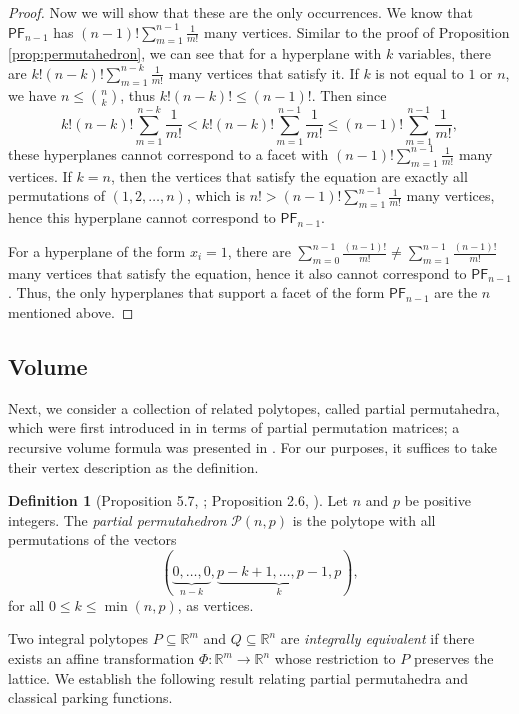 \documentclass[11pt]{amsart}
\theoremstyle{definition}
\newtheorem{definition}[theorem]{Definition}
\newcommand{\0}{\emptyset}
\newcommand{\R}{\mathbb{R}}
\newcommand{\PF}{\mathsf{PF}}
\begin{document}
\begin{proof}
Now we will show that these are the only occurrences. 
We know that $\PF_{n-1}$ has $(n-1)!\sum\limits_{m=1}^{n-1} \frac{1}{m!}$ many  vertices.
Similar to the proof of Proposition \ref{prop:permutahedron}, we can see that for a hyperplane with $k$ variables, there are $k!(n-k)!\sum\limits_{m=1}^{n-k} \frac{1}{m!}$ many vertices that satisfy it. 
If $k$ is not equal to $1$ or $n$, we have $n\leq \binom{n}{k}$, thus $k!(n-k)!\leq (n-1)!$.
Then since $$k!(n-k)!\sum\limits_{m=1}^{n-k} \frac{1}{m!} < k!(n-k)!\sum\limits_{m=1}^{n-1} \frac{1}{m!} \leq (n-1)! \sum\limits_{m=1}^{n-1} \frac{1}{m!},$$  these hyperplanes cannot correspond to a facet with $(n-1)!\sum\limits_{m=1}^{n-1} \frac{1}{m!}$ many vertices.
If $k =n$, then the vertices that satisfy the equation are exactly all permutations of $(1,2,\dots, n)$, which is $n! > (n-1)! \sum\limits_{m=1}^{n-1} \frac{1}{m!}$ many vertices, hence this hyperplane cannot correspond to $\PF_{n-1}$. 

For a hyperplane of the form $x_i = 1$, there are $\sum_{m=0}^{n-1}\frac{(n-1)!}{m!} \neq \sum_{m=1}^{n-1} \frac{(n-1)!}{m!}$ many vertices that satisfy the equation, hence it also cannot correspond to $\PF_{n-1}$. 
Thus, the only hyperplanes that support a facet of the form $\PF_{n-1}$ are the $n$ mentioned above.
\end{proof}


\subsection{Volume}
Next, we consider a collection of related polytopes, called partial permutahedra, which were first introduced in \cite{HS} in terms of partial permutation matrices; a recursive volume formula was presented in \cite{BCC}.
For our purposes, it suffices to take their vertex description as the definition.

\begin{definition}[Proposition 5.7, \cite{HS}; Proposition 2.6, \cite{BCC}]\label{def:pp-vertices} Let $n$ and $p$ be positive integers. 
The \emph{partial permutahedron} $\mathcal{P}(n,p)$ is the polytope with all permutations of the vectors 
\[(\underbrace{0, \ldots, 0}_{n-k}, \underbrace{p-k+1, \ldots, p-1, p}_k ),\]
for all $0 \leq k \leq \min(n,p)$, as vertices.
\end{definition}

Two integral polytopes $P\subseteq \R^m$ and $Q\subseteq \R^n$ are \emph{integrally equivalent} if there exists an affine transformation $\Phi:\R^m \rightarrow \R^n$ whose restriction to $P$ preserves the lattice.
We establish the following result relating partial permutahedra and classical parking functions.
\end{document}
